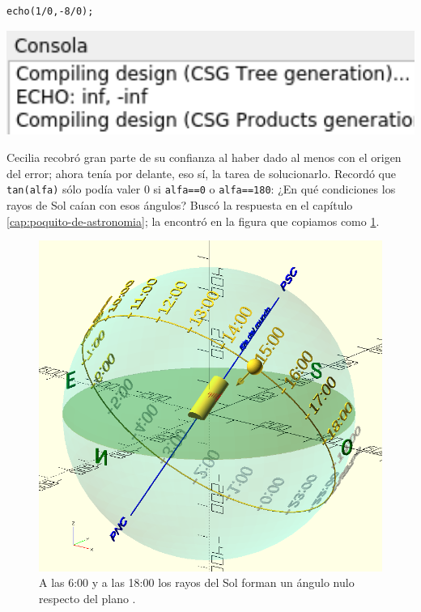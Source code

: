 \begin{center}
  \begin{minipage}[]{.45\textwidth}%
    \begin{lstlisting}
echo(1/0,-8/0);
    \end{lstlisting}%
  \end{minipage}\hfill
   \begin{minipage}[]{.55\textwidth}%
       \centering
       \includegraphics[width=1\textwidth]{imagenes/infinitos}
\end{minipage}
\end{center}

Cecilia recobró gran parte de su confianza al haber dado al menos con
el origen del error; ahora tenía por delante, eso sí, la tarea de
solucionarlo. Recordó que \lstinline!tan(alfa)! sólo podía valer 0 si
\lstinline!alfa==0! o \lstinline!alfa==180!: ¿En qué condiciones los
rayos de Sol caían con esos ángulos? Buscó la respuesta en el capítulo
\ref{cap:poquito-de-astronomia}; la encontró en la figura que copiamos
como \ref{fig:sol-15-horas-bug}.


\begin{figure}[ht]
  \centering
  \includegraphics[width=.6\textwidth]{imagenes/sol-15-horas.png}  
  \caption{A las 6:00 y a las 18:00 los rayos del Sol forman un ángulo
    nulo respecto del plano .}
  \label{fig:sol-15-horas-bug}
\end{figure}


